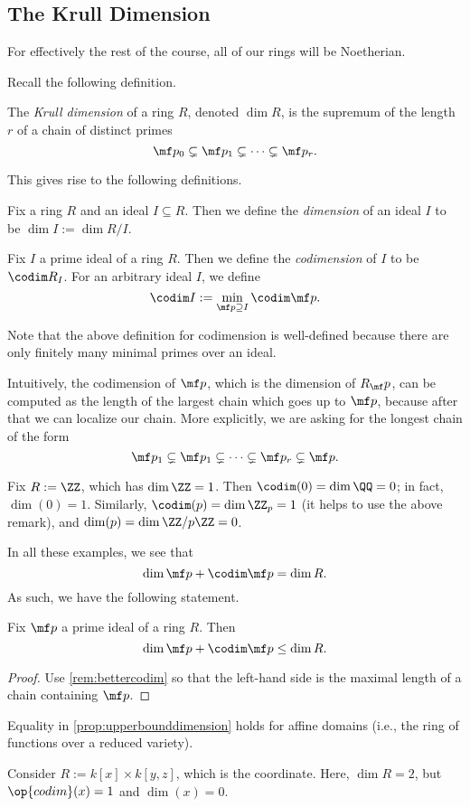 \subsection{The Krull Dimension}
\begin{warn}
	For effectively the rest of the course, all of our rings will be Noetherian.
\end{warn}
Recall the following definition.
\begin{definition}
	The \textit{Krull dimension} of a ring $R$, denoted $\dim R$, is the supremum of the length $r$ of a chain of distinct primes
	\[\mf p_0\subsetneq\mf p_1\subsetneq\cdots\subsetneq\mf p_r.\]
\end{definition} %
This gives rise to the following definitions.
\begin{definition}
	Fix a ring $R$ and an ideal $I\subseteq R$. Then we define the \textit{dimension} of an ideal $I$ to be $\dim I:=\dim R/I$.
\end{definition}
\begin{definition}[Codimension]
	Fix $I$ a prime ideal of a ring $R$. Then we define the \textit{codimension} of $I$ to be $\codim R_I$. For an arbitrary ideal $I$, we define
	\[\codim I:=\min_{\mf p\supseteq I}\codim\mf p.\]
\end{definition}
Note that the above definition for codimension is well-defined because there are only finitely many minimal primes over an ideal.
\begin{remark} \label{rem:bettercodim}
	Intuitively, the codimension of $\mf p$, which is the dimension of $R_\mf p$, can be computed as the length of the largest chain which goes up to $\mf p$, because after that we can localize our chain. More explicitly, we are asking for the longest chain of the form
	\[\mf p_1\subsetneq\mf p_1\subsetneq\cdots\subsetneq\mf p_r\subsetneq\mf p.\]
\end{remark}
\begin{example}
	Fix $R:=\ZZ$, which has $\dim\ZZ=1$. Then $\codim(0)=\dim\QQ=0$; in fact, $\dim(0)=1$. Similarly, $\codim(p)=\dim\ZZ_p=1$ (it helps to use the above remark), and $\dim(p)=\dim\ZZ/p\ZZ=0$.
\end{example}
In all these examples, we see that
\[\dim\mf p+\codim\mf p=\dim R.\]
As such, we have the following statement.
\begin{proposition} \label{prop:upperbounddimension}
	Fix $\mf p$ a prime ideal of a ring $R$. Then
	\[\dim\mf p+\codim\mf p\le\dim R.\]
\end{proposition}
\begin{proof}
	Use \autoref{rem:bettercodim} so that the left-hand side is the maximal length of a chain containing $\mf p$.
\end{proof}
\begin{remark}
	Equality in \autoref{prop:upperbounddimension} holds for affine domains (i.e., the ring of functions over a reduced variety).
\end{remark}
\begin{example}
	Consider $R:=k[x]\times k[y,z]$, which is the coordinate. Here, $\dim R=2$, but $\op{codim}(x)=1$ and $\dim(x)=0$.
\end{example}

